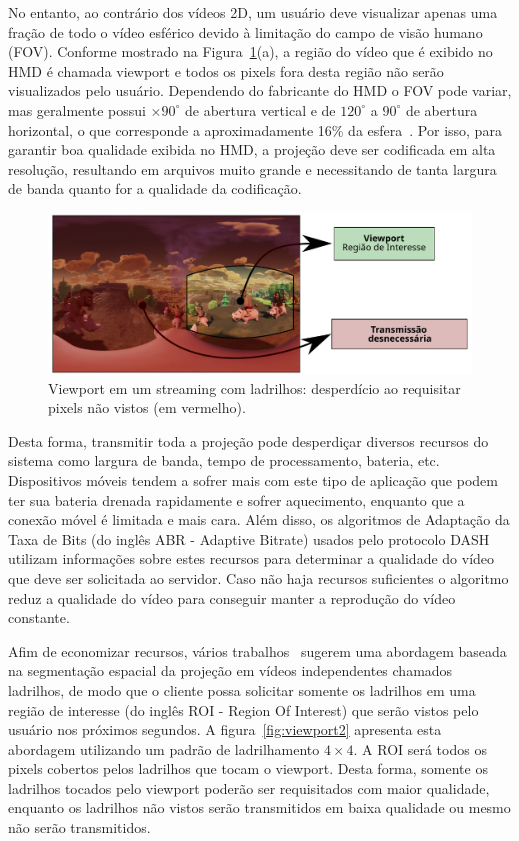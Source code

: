 No entanto, ao contrário dos vídeos 2D, um usuário deve visualizar apenas uma fração de todo o vídeo esférico devido à limitação do campo de visão humano (FOV). Conforme mostrado na Figura~\ref{fig:viewport1}(a), a região do vídeo que é exibido no HMD é chamada viewport e todos os pixels fora desta região não serão visualizados pelo usuário. Dependendo do fabricante do HMD o FOV pode variar, mas geralmente possui $\times90^{\circ}$ de abertura vertical e de $120^{\circ}$ a $90^{\circ}$ de abertura horizontal, o que corresponde a aproximadamente 16\% da esfera~\cite{Afzal2017}. Por isso, para garantir boa qualidade exibida no HMD, a projeção deve ser codificada em alta resolução, resultando em arquivos muito grande e necessitando de tanta largura de banda quanto for a qualidade da codificação. 

\begin{figure}[h]
        \centering
        \includegraphics[width=0.80\columnwidth]{fig/viewport1.pdf}
        \caption{Viewport em um streaming com ladrilhos: desperdício ao requisitar pixels não vistos (em vermelho).}
        \label{fig:viewport1}
\end{figure}

Desta forma, transmitir toda a projeção pode desperdiçar diversos recursos do sistema como largura de banda, tempo de processamento, bateria, etc. Dispositivos móveis tendem a sofrer mais com este tipo de aplicação que podem ter sua bateria drenada rapidamente e sofrer aquecimento, enquanto que a conexão móvel é limitada e mais cara. Além disso, os algoritmos de Adaptação da Taxa de Bits (do inglês ABR - Adaptive Bitrate) usados pelo protocolo DASH utilizam informações sobre estes recursos para determinar a qualidade do vídeo que deve ser solicitada ao servidor. Caso não haja recursos suficientes o algoritmo reduz a qualidade do vídeo para conseguir manter a reprodução do vídeo constante.

Afim de economizar recursos, vários trabalhos~\cite{Alface2012, Zare2016, Qian2018, Liu2017, Graf2017, Xiao2018, Nasrabadi2019} sugerem uma abordagem baseada na segmentação espacial da projeção em vídeos independentes chamados ladrilhos, de modo que o cliente possa solicitar somente os ladrilhos em uma região de interesse (do inglês ROI - Region Of Interest) que serão vistos pelo usuário nos próximos segundos. A figura~\ref{fig:viewport2} apresenta esta abordagem utilizando um padrão de ladrilhamento $4 \times 4$. A ROI será todos os pixels cobertos pelos ladrilhos que tocam o viewport. Desta forma, somente os ladrilhos tocados pelo viewport poderão ser requisitados com maior qualidade, enquanto os ladrilhos não vistos serão transmitidos em baixa qualidade ou mesmo não serão transmitidos. 

